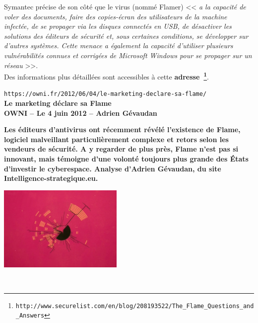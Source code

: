 \documentclass[11pt,twoside,a4paper]{article}
\begin{document}
Symantec pr{\'e}cise de son c{\^o}t{\'e} que le virus (nomm{\'e} Flamer) << \emph{a la capacit{\'e} de voler des documents, faire des copies-{\'e}cran des utilisateurs de la machine infect{\'e}e, de se propager via les disques connect{\'e}s en USB, de d{\'e}sactiver les solutions des {\'e}diteurs de s{\'e}curit{\'e} et, sous certaines conditions, se d{\'e}velopper sur d'autres syst{\`e}mes. Cette menace a {\'e}galement la capacit{\'e} d'utiliser plusieurs vuln{\'e}rabilit{\'e}s connues et corrig{\'e}es de Microsoft Windows pour se propager sur un r{\'e}seau } >>.~\\

Des informations plus d{\'e}taill{\'e}es sont accessibles {\`a} cette \textbf{adresse~\footnote{\texttt{http://www.securelist.com/en/blog/208193522/The\_Flame\_Questions\_and\_Answers}}}.~\\

\clearpage

\texttt{https://owni.fr/2012/06/04/le-marketing-declare-sa-flame/}~\\

\textbf{\LARGE Le marketing d{\'e}clare sa Flame}~\\

\textbf{\small OWNI -- Le 4 juin 2012 -- Adrien G{\'e}vaudan}~\\

\begin{minipage}[ht]{12.50cm}
	\textbf{Les {\'e}diteurs d'antivirus ont r{\'e}cemment r{\'e}v{\'e}l{\'e} l'existence de Flame, logiciel malveillant particuli{\`e}rement complexe et retors selon les vendeurs de s{\'e}curit{\'e}. A y regarder de plus pr{\`e}s, Flame n'est pas si innovant, mais t{\'e}moigne d'une volont{\'e} toujours plus grande des {\'E}tats d'investir le cyberespace. Analyse d'Adrien G{\'e}vaudan, du site Intelligence-strategique.eu. } %
\end{minipage} \hfill \begin{minipage}[ht]{6.25cm}
	\includegraphics[width=6.00cm]{img/antivirus-flame-cyber-espace-renseignement-surveillance-stuxnet-doku.jpg}
\end{minipage}~\\
\end{document}
